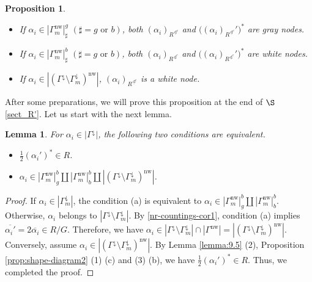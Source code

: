 \documentclass[11pt]{amsart}
\newcommand{\dc}{\,\underline{\mathrm{d}}^c}
\newcommand{\nw}{\mathrm{nw}}
\newtheorem{prop}[thm]{Proposition}%
\newtheorem{lemma}[thm]{Lemma}%
\begin{document}
{\begin{prop}
\begin{itemize}
$|\Gamma(R^{\dc},G)\vert$ is a white node also.
\item If $\alpha_i\in |\Gamma_m^\nw|_\sharp^g\,\, (\sharp=g \text{ or }b)$, both 
$(\alpha_i)_{R^{\dc}}$ and $\big((\alpha_i)_{R^{\dc}}'\big)^\ast$ are gray nodes.
\item If $\alpha_i\in |\Gamma_m^\nw|_\sharp^b\,\, (\sharp=g \text{ or }b)$, both 
$(\alpha_i)_{R^{\dc}}$ and $\big((\alpha_i)_{R^{\dc}}'\big)^\ast$ are white nodes. 
\item If $\alpha_i\in |(\Gamma^\downarrow
\setminus\Gamma_m^\downarrow)^\nw|$,  
$(\alpha_i)_{R^{\dc}}$ is a white node. 
\end{itemize}
\end{prop}

After some preparations, we will prove this proposition at the end of 
$\S$ \ref{sect_R'}. 
Let us start with the next lemma. 

\begin{lemma}\label{lemma:black-ast}
For $\alpha_i\in |\Gamma^\downarrow|$, the following two conditions are equivalent.
\begin{itemize}
\item[(a)] $\frac12 (\alpha_i')^\ast\in R$.
\vskip 1mm
\item[(b)] $\alpha_i\in |\Gamma^\nw_m|_g^b\amalg |\Gamma^\nw_m|_b^b\amalg 
|(\Gamma^{\downarrow}\setminus \Gamma^{\downarrow}_m)^\nw|$.
\end{itemize}
\end{lemma}
\begin{proof}
If $\alpha_i\in |\Gamma_m^\downarrow|$, the condition (a) is equivalent to 
$\alpha_i\in |\Gamma^\nw_m|_g^b\amalg |\Gamma^\nw_m|_b^b$. 
Otherwise, $\alpha_i$ belongs to 
$|\Gamma^\downarrow\setminus \Gamma_m^\downarrow|$. 
By \eqref{nr-countings-cor1}, condition (a) 
implies $\overline{\alpha_i'}=2\overline{\alpha_i}\in R/G$. 
Therefore, we have 
$\alpha_i\in |\Gamma^\downarrow\setminus \Gamma_m^\downarrow|\cap 
|\Gamma^\nw|=
|(\Gamma^{\downarrow}\setminus \Gamma^{\downarrow}_m)^\nw|$. Conversely,
assume $\alpha_i\in 
|(\Gamma^{\downarrow}\setminus \Gamma^{\downarrow}_m)^\nw|$. 
By Lemma \ref{lemma:9.5} (2), Proposition \ref{prop:shape-diagram2} (1) (c) and 
(3) (b), we have $\frac12 (\alpha_i')^\ast\in R$. Thus, we completed  the proof.
\end{proof}

}
\end{document}
